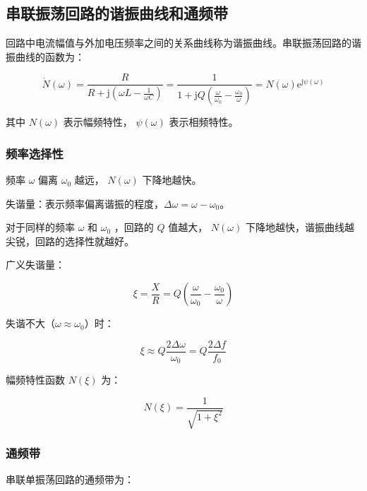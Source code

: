 \subsection{串联振荡回路的谐振曲线和通频带}

回路中电流幅值与外加电压频率之间的关系曲线称为谐振曲线。串联振荡回路的谐振曲线的函数为：

\begin{equation}
    \dot{N}(\omega) = \frac{R}{R + \text{j}(\omega L - \frac{1}{\omega C})} = \frac{1}{1 + \text{j} Q \left( \frac{\omega}{\omega_0} - \frac{\omega_0}{\omega} \right) } = N(\omega) \text{e}^{\text{j} \psi(\omega)}
\end{equation}

其中 $N(\omega)$ 表示幅频特性， $\psi(\omega)$ 表示相频特性。

\subsubsection{频率选择性}

频率 $\omega$ 偏离 $\omega_0$ 越远， $N(\omega)$ 下降地越快。

失谐量：表示频率偏离谐振的程度，$\Delta \omega = \omega - \omega_0$。

对于同样的频率 $\omega$ 和 $\omega_0$ ，回路的 $Q$ 值越大， $N(\omega)$ 下降地越快，谐振曲线越尖锐，回路的选择性就越好。

广义失谐量：

\begin{equation}
    \xi = \frac{X}{R} = Q \left( \frac{\omega}{\omega_0} - \frac{\omega_0}{\omega} \right)
\end{equation}

失谐不大（$\omega \approx \omega_0$）时：

\begin{equation}
    \xi \approx Q \frac{2\Delta \omega}{\omega_0} = Q \frac{2\Delta f}{f_0}
\end{equation}

幅频特性函数 $N(\xi)$ 为：

\begin{equation}
    N(\xi) = \frac{1}{\sqrt{1 + \xi^2}}
\end{equation}

\subsubsection{通频带}

串联单振荡回路的通频带为：

